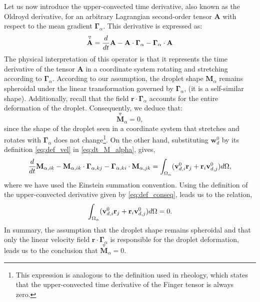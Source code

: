 Let us now introduce the upper-convected time derivative, also known as the Oldroyd derivative, for an arbitrary Lagrangian second-order tensor $\textbf{A}$ with respect to the mean gradient $\bm\Gamma_\alpha$. 
This derivative is expressed as: 
\begin{equation}
    \overset{\triangledown  }{\textbf{A}}
    = 
    \ddt \textbf{A}
    - \textbf{A} \cdot \bm\Gamma_\alpha
    - \bm\Gamma_\alpha \cdot \textbf{A}
    \label{eq:def_upper}
\end{equation}
The physical interpretation of this operator is that it represents the time derivative of the tensor $\textbf{A}$ in a coordinate system rotating and stretching according to $\bm\Gamma_\alpha$.  
According to our assumption, the droplet shape $\textbf{M}_\alpha$ remains spheroidal under the linear transformation governed by $\bm\Gamma_\alpha$, (it is a self-similar shape). 
Additionally, recall that the field $\textbf{r}\cdot \bm\Gamma_\alpha$ accounts for the entire deformation of the droplet. 
Consequently, we deduce that:
\begin{equation}
    \overset{ \triangledown  }{\textbf{M}}_\alpha
    = 0, 
    \label{eq:def_conseq}
\end{equation}
since the shape of the droplet seen in a coordinate system that stretches and rotates with $\bm\Gamma_\alpha$ does not change\footnote{
    This expression is analogous to the definition used in rheology, which states that the upper-convected time derivative of the Finger tensor is always zero.
}.
On the other hand, substituting $\textbf{w}_d^0$ by its definition \eqref{eq:def_vel} in \ref{eq:dt_M_alpha}, gives, 
\begin{equation}
    \frac{d}{dt} \textbf{M}_{\alpha,ik}
    -
    \textbf{M}_{\alpha,ik} \cdot \bm\Gamma_{\alpha,kj}
    -  \bm\Gamma_{\alpha,ki} \cdot \textbf{M}_{\alpha,jk}
    =
    \int_{\Omega_{\alpha}}  
        (\textbf{v}_{d,i}^0\textbf{r}_j
        + \textbf{r}_i\textbf{v}_{d,j}^0)
     d\Omega,
\end{equation}
where we have used the Einstein summation convention. 
Using the definition of the upper-convected derivative given by \ref{eq:def_conseq}, leads us to the relation,
\begin{equation}
    \intO{ 
        (\textbf{v}_{d,i}^0\textbf{r}_j
        + \textbf{r}_i\textbf{v}_{d,j}^0)
    }
    =
    0.  
    \label{eq:def_v}
\end{equation}
In summary, the assumption that the droplet shape remains spheroidal and that only the linear velocity field $\textbf{r}\cdot \bm\Gamma_\alpha$ is responsible for the droplet deformation, leads us to the conclusion that $\overset{\triangledown}{\textbf{M}}_\alpha= 0$. 
